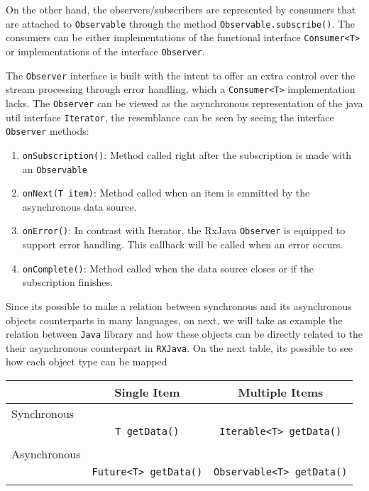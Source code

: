 On the other hand, the observers/subscribers are represented by consumers that are attached to \texttt{Observable} through the method \texttt{Observable.subscribe()}.
The consumers can be either implementations of the functional interface \texttt{Consumer<T>} or implementations of the interface \texttt{Observer}.

The \texttt{Observer} interface is built with the intent to offer an extra control over the stream processing through error handling, which a \texttt{Consumer<T>} implementation lacks. The \texttt{Observer} can be viewed as the asynchronous representation of the java util interface \texttt{Iterator}, the resemblance can be seen by seeing the interface \texttt{Observer} methods:

\begin{enumerate}
     \item \texttt{onSubscription()}: Method called right after the subscription is made with an \texttt{Observable} 
	 \item \texttt{onNext(T item)}: Method called when an item is emmitted by the asynchronous data source.
	 \item \texttt{onError()}: In contrast with Iterator, the RxJava \texttt{Observer} is equipped to support error handling. This callback will be called when an error occurs.
	 \item \texttt{onComplete()}: Method called when the data source closes or if the subscription finishes.
\end{enumerate}	

Since its possible to make a relation between synchronous and its asynchronous objects counterparts in many languages, on next, we will take as example the relation between \texttt{Java} library and how these objects can be directly related to the their asynchronous counterpart in \texttt{RXJava}.
On the next table, its possible to see how each object type can be mapped 

\begin{center}
\begin{tabular}{ |l|c|c| }
\hline
	& Single Item & Multiple Items \\ \hline
\multirow{}{}{Synchronous}
& & \\ 
& \texttt{T getData()}  & \texttt{Iterable<T> getData()} \\
	& & \\
	\hline
\multirow{}{}{Asynchronous}
& & \\ 
& \texttt{Future<T> getData()} & \texttt{Observable<T> getData()} \\
	& & \\
	\hline
\end{tabular}
\end{center}


